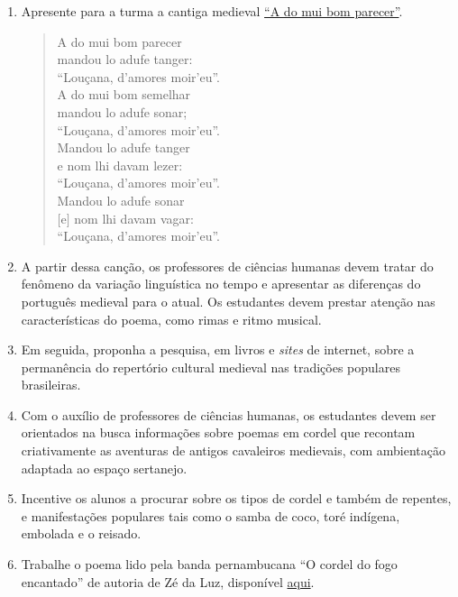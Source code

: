 \documentclass[12pt]{extarticle}
\begin{document}
\begin{enumerate}

\item Apresente para a turma a cantiga medieval
  \href{https://cantigas.fcsh.unl.pt/versaomusical.asp?cdcant=1307&cdvm=247}{``A
do mui bom parecer''}.

\begin{verse} 
A do mui bom parecer\\ 
mandou lo adufe tanger:\\ 
\quad ``Louçana, d'amores moir'eu''.\\ 
A do mui bom semelhar\\ 
mandou lo adufe sonar;\\ 
\quad ``Louçana, d'amores moir'eu''.\\ 
Mandou lo adufe tanger\\ 
e nom lhi davam lezer:\\ 
\quad ``Louçana, d'amores moir'eu''.\\ 
Mandou lo adufe sonar\\ 
$[$e$]$ nom lhi davam vagar:\\ 
\quad ``Louçana, d'amores moir'eu''.  
\end{verse}

\item A partir dessa canção, os professores de ciências humanas devem tratar do
  fenômeno da variação linguística no tempo e apresentar as diferenças do
  português medieval para o atual. Os estudantes devem prestar atenção nas
  características do poema, como rimas e ritmo musical.
  
\item Em seguida, proponha a pesquisa, em livros e \emph{sites} de internet,
  sobre a permanência do repertório cultural medieval nas tradições populares
  brasileiras.

\item  Com o auxílio de professores de ciências humanas, os estudantes devem
  ser orientados na busca informações sobre poemas em cordel que recontam
  criativamente as aventuras de antigos cavaleiros medievais, com ambientação
  adaptada ao espaço sertanejo. 

\item Incentive os alunos a procurar sobre os tipos de cordel e também de
  repentes, e manifestações populares tais como o samba de coco, toré indígena,
  embolada e o reisado. 

\item Trabalhe o poema lido pela banda pernambucana ``O cordel do fogo
  encantado'' de autoria de Zé da Luz, disponível
  \href{https://youtu.be/8NBauvFV6bo}{aqui}.


\end{enumerate}
\end{document}
